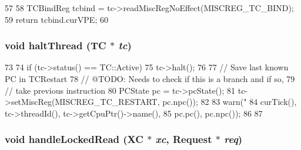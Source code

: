 \begin{DoxyCode}
57 {
58     TCBindReg tcbind = tc->readMiscRegNoEffect(MISCREG_TC_BIND);
59     return tcbind.curVPE;
60 }
\end{DoxyCode}
\hypertarget{namespaceMipsISA_ae1180cae39b870a32a413b188c7b4c55}{
\subsubsection[{haltThread}]{\setlength{\rightskip}{0pt plus 5cm}void haltThread (TC $\ast$ {\em tc})}}
\label{namespaceMipsISA_ae1180cae39b870a32a413b188c7b4c55}



\begin{DoxyCode}
73 {
74     if (tc->status() == TC::Active) {
75         tc->halt();
76 
77         // Save last known PC in TCRestart
78         // @TODO: Needs to check if this is a branch and if so,
79         // take previous instruction
80         PCState pc = tc->pcState();
81         tc->setMiscReg(MISCREG_TC_RESTART, pc.npc());
82 
83         warn("%
84                 curTick(), tc->threadId(), tc->getCpuPtr()->name(),
85                 pc.pc(), pc.npc());
86     }
87 }
\end{DoxyCode}
\hypertarget{namespaceMipsISA_aa7cc172c439c44fb54dc4c9ba7d90c3d}{
\subsubsection[{handleLockedRead}]{\setlength{\rightskip}{0pt plus 5cm}void handleLockedRead (XC $\ast$ {\em xc}, \/  {\bf Request} $\ast$ {\em req})}}
\label{namespaceMipsISA_aa7cc172c439c44fb54dc4c9ba7d90c3d}



